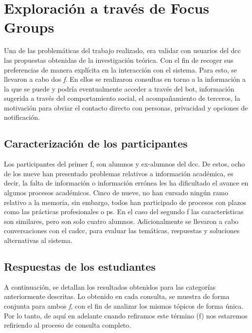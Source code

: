 \section{Exploración a través de Focus Groups}\label{sec:focus}
    \par Una de las problemáticas del trabajo realizado, era validar con usuarios del \acrshort{dcc} las propuestas obtenidas de la investigación teórica. Con el fin de recoger sus preferencias de manera explícita en la interacción con el sistema. Para esto, se llevaron a cabo dos \textit{\acrlong{f}}. En ellos se realizaron consultas en torno a la información a la que se puede y podría eventualmente acceder a través del bot, información sugerida a través del comportamiento social, el acompañamiento de terceros, la motivación para obviar el contacto directo con personas, privacidad y opciones de notificación.
    
    \subsection{Caracterización de los participantes}
    \par Los participantes del primer \acrshort{f}, son alumnos y ex-alumnos del \acrshort{dcc}. De estos, ocho de los nueve han presentado problemas relativos a información académica, es decir, la falta de información o información errónea les ha dificultado el avance en algunos procesos académicos. Cinco de nueve, no han cursado ningún ramo relativo a la memoria, sin embargo, todos han participado de procesos con plazos como las prácticas profesionales o \acrlong{ps}. En el caso del segundo \acrlong{f} las características son similares, pero son solo cuatro alumnos. Adicionalmente se llevaron a cabo conversaciones con el \acrshort{cadcc}, para evaluar las temáticas, respuestas y soluciones alternativas al sistema.
    
    \subsection{Respuestas de los estudiantes}
    \par A continuación, se detallan los resultados obtenidos para las categorías anteriormente descritas. Lo obtenido en cada consulta, se muestra de forma conjunta para ambos \textit{\acrlong{f}}, con el fin de analizar los mismos tópicos de forma única. Por lo tanto, de aquí en adelante cuando refiramos este término (\acrlong{f}) nos estaremos refiriendo al proceso de consulta completo.
    
